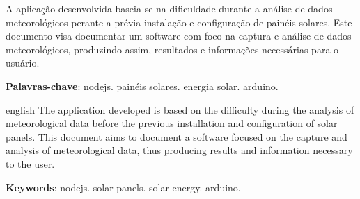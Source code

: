 
\setlength{\absparsep}{18pt} %
\begin{resumo}
  A aplicação desenvolvida baseia-se na dificuldade durante a análise de dados meteorológicos perante a prévia instalação e configuração de painéis solares. Este documento visa documentar um software com foco na captura e análise de dados meteorológicos, produzindo assim, resultados e informações necessárias para o usuário.

 \textbf{Palavras-chave}: nodejs. painéis solares. energia solar. arduino.
\end{resumo}

\begin{resumo}[Abstract]
 \begin{otherlanguage*}{english}
  The application developed is based on the difficulty during the analysis of meteorological data before the previous installation and configuration of solar panels. This document aims to document a software focused on the capture and analysis of meteorological data, thus producing results and information necessary to the user.

   \vspace{\onelineskip}

   \noindent
   \textbf{Keywords}: nodejs. solar panels. solar energy. arduino.
 \end{otherlanguage*}
\end{resumo}
